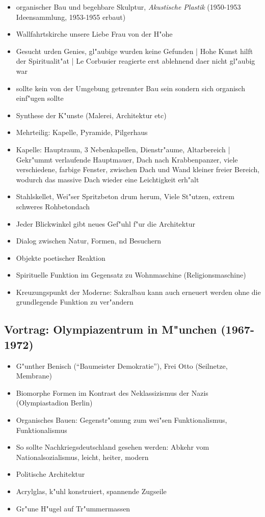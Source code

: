 \documentclass[a5paper]{scrartcl}
\begin{document}
\begin{itemize}
  \item organischer Bau und begehbare Skulptur, \emph{Akustische Plastik} (1950-1953 Ideensammlung, 1953-1955 erbaut)
  \item Wallfahrtskirche unsere Liebe Frau von der H"ohe
  \item Gesucht urden Genies, gl"aubige wurden keine Gefunden | Hohe Kunst hilft der Spiritualit"at | Le Corbusier reagierte erst ablehnend daer nicht gl"aubig war
  \item sollte kein von der Umgebung getrennter Bau sein sondern sich organisch einf"ugen sollte
  \item Synthese der K"unste (Malerei, Architektur etc)
  \item Mehrteilig: Kapelle, Pyramide, Pilgerhaus
  \item Kapelle: Hauptraum, 3 Nebenkapellen, Dienstr"aume, Altarbereich | Gekr"ummt verlaufende Hauptmauer, Dach nach Krabbenpanzer, viele verschiedene, farbige Fenster, zwischen Dach und Wand kleiner freier Bereich, wodurch das massive Dach wieder eine Leichtigkeit erh"alt
  \item Stahlskellet, Wei"ser Spritzbeton drum herum, Viele St"utzen, extrem schweres Rohbetondach
  \item Jeder Blickwinkel gibt neues Gef"uhl f"ur die Architektur
  \item Dialog zwischen Natur, Formen, nd Besuchern
  \item Objekte poetischer Reaktion
  \item Spirituelle Funktion im Gegensatz zu Wohnmaschine (Religionsmaschine)
  \item Kreuzungspunkt der Moderne: Sakralbau kann auch erneuert werden ohne die grundlegende Funktion zu ver"andern
\end{itemize}


\subsection{Vortrag: Olympiazentrum in M"unchen (1967-1972)}

\begin{itemize}
  \item G"unther Benisch ("`Baumeister Demokratie"'), Frei Otto (Seilnetze, Membrane)
  \item Biomorphe Formen im Kontrast des Neklassizismus der Nazis (Olympiastadion Berlin)
  \item Organisches Bauen: Gegenstr"omung zum wei"sen Funktionalismus, Funktionalismus
  \item So sollte Nachkriegsdeutschland gesehen werden: Abkehr vom Nationalsozialismus, leicht, heiter, modern
  \item Politische Architektur
  \item Acrylglas, k"uhl konstruiert, spannende Zugseile
  \item Gr"une H"ugel auf Tr"ummermassen
\end{itemize}
\end{document}
